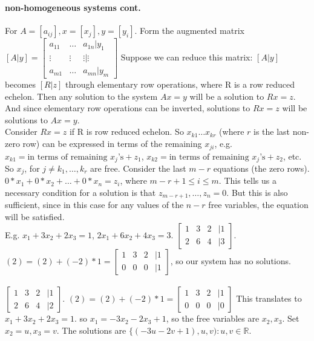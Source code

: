 \documentclass[10pt,letter]{article}
\begin{document}
\section*{}

\paragraph*{non-homogeneous systems cont.}
For $A=[a_{ij}], x=[x_j], y=[y_i]$. Form the augmented matrix $[A|y]=\begin{bmatrix}
a_{11} & \ldots & a_{1n} | y_1 \\ 
\vdots & \vdots & \vdots | \vdots \\
a_{m1} & \ldots & a_{mn} | y_m
\end{bmatrix}
$
Suppose we can reduce this matrix: $[A|y]$ becomes $[R|z]$ through elementary row operations, where R is a row reduced echelon. Then any solution to the system $Ax=y$ will be a solution to $Rx=z$. And since elementary row operations can be inverted, solutions to $Rx=z$ will be solutions to $Ax=y$. \\ 

Consider $Rx=z$ if R is row reduced echelon. So $x_{k1}\ldots x_{kr}$ (where $r$ is the last non-zero row) can be expressed in terms of the remaining $x_{ji}$, e.g. $x_{k1}=\text{in terms of remaining }x_j\text{'s}+z_1$, $x_{k2}=\text{in terms of remaining }x_j\text{'s}+z_2$, etc. So $x_j$, for $j\neq k_1,\ldots, k_r$ are free. 
Consider the last $m-r$ equations (the zero rows). $0*x_1+0*x_2+\ldots+0*x_n=z_i$, where $m-r+1\leq i\leq m$. This tells us a necessary condition for a solution is that $z_{m-r+1},\ldots, z_n = 0$. But this is also sufficient, since in this case for any values of the $n-r$ free variables, the equation will be satisfied. \\

E.g. $x_1+3x_2+2x_3=1$, $2x_1+6x_2+4x_3=3$. $\begin{bmatrix}
1 & 3 & 2 &| 1 \\ 
2 & 6 & 4 &| 3 
\end{bmatrix}
$. $(2)=(2)+(-2)*1 = \begin{bmatrix}
1 & 3 & 2 &| 1 \\ 
0 & 0 & 0 &| 1 
\end{bmatrix}$, so our system has no solutions. \\ \\ 

$\begin{bmatrix}
1 & 3 & 2 &| 1 \\ 
2 & 6 & 4 &| 2 \end{bmatrix}$. $(2)=(2)+(-2)*1 = \begin{bmatrix}
1 & 3 & 2 &| 1 \\ 
0 & 0 & 0 &| 0 
\end{bmatrix}$ This translates to $x_1+3x_2+2x_3=1$. so $x_1 = -3x_2-2x_3+1$, so the free variables are $x_2, x_3$. Set $x_2=u,x_3=v$. The solutions are $\{(-3u-2v+1), u, v): u,v\in\mathbb{R}$.\\ \\ 
\end{document}
